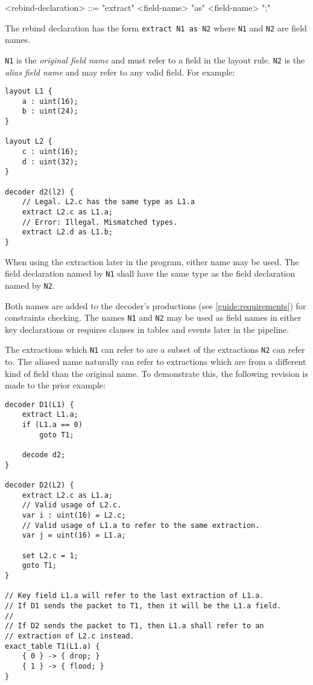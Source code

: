 \begin{minip}
\begin{grammar}
<rebind-declaration> ::=
"extract" <field-name> "as" <field-name> ";"
\end{grammar}
\end{minip}

The rebind declaration has the form \texttt{extract N1 as N2} where \texttt{N1} and \texttt{N2} are field names.

\texttt{N1} is the \textit{original field name} and must refer to a field in the layout rule. \texttt{N2} is the \textit{alias field name} and may refer to any valid field. For example:

\begin{minip}
\begin{lstlisting}
layout L1 {
	a : uint(16);
	b : uint(24);
}

layout L2 {
	c : uint(16);
	d : uint(32);
}

decoder d2(l2) {
	// Legal. L2.c has the same type as L1.a
	extract L2.c as L1.a;
	// Error: Illegal. Mismatched types.
	extract L2.d as L1.b;
} 
\end{lstlisting}
\end{minip}

When using the extraction later in the program, either name may be used. The field declaration named by \texttt{N1} shall have the same type as the field declaration named by \texttt{N2}. 

Both names are added to the decoder's productions (see \ref{guide:requirements}) for constraints checking. The names \texttt{N1} and \texttt{N2} may be used as field names in either key declarations or requires clauses in tables and events later in the pipeline. 

The extractions which \texttt{N1} can refer to are a subset of the extractions \texttt{N2} can refer to. The aliased name naturally can refer to extractions which are from a different kind of field than the original name. To demonstrate this, the following revision is made to the prior example:

\begin{minip}
\begin{lstlisting}
decoder D1(L1) {
	extract L1.a;
	if (L1.a == 0)
		goto T1;
	
	decode d2;
}

decoder D2(L2) {
	extract L2.c as L1.a;
	// Valid usage of L2.c.
	var i : uint(16) = L2.c;
	// Valid usage of L1.a to refer to the same extraction.
	var j = uint(16) = L1.a;

	set L2.c = 1;
	goto T1;
}

// Key field L1.a will refer to the last extraction of L1.a.
// If D1 sends the packet to T1, then it will be the L1.a field.
// 
// If D2 sends the packet to T1, then L1.a shall refer to an
// extraction of L2.c instead.
exact_table T1(L1.a) {
	{ 0 } -> { drop; }
	{ 1 } -> { flood; }
}
\end{lstlisting}
\end{minip}

